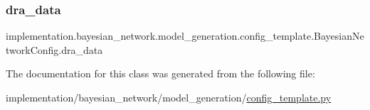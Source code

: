\subsubsection{\texorpdfstring{dra\+\_\+data}{dra\_data}}
{\footnotesize\ttfamily implementation.\+bayesian\+\_\+network.\+model\+\_\+generation.\+config\+\_\+template.\+Bayesian\+Network\+Config.\+dra\+\_\+data}



The documentation for this class was generated from the following file\+:\begin{DoxyCompactItemize}
\item 
implementation/bayesian\+\_\+network/model\+\_\+generation/\hyperlink{config__template_8py}{config\+\_\+template.\+py}\end{DoxyCompactItemize}
